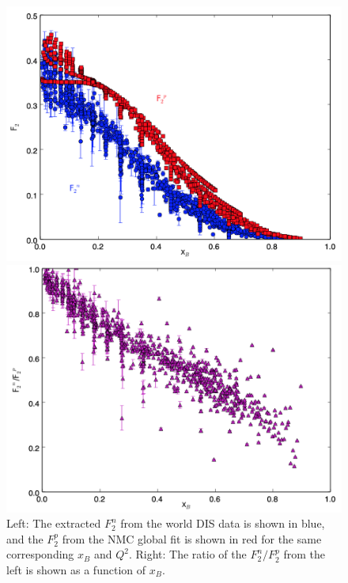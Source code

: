 \documentclass[oneside]{article}
\begin{document}
 \begin{figure}
\begin{minipage}{0.5\textwidth}
 \includegraphics[width=\textwidth]{plots/f2np_plot.png}
\end{minipage}\hfill\begin{minipage}{0.5\textwidth}
 \includegraphics[width=\textwidth]{plots/f2npratio_plot.png}
 \end{minipage}
  \caption[$F_2^{n,p}$ characteristics]{Left: The extracted $F_2^n$ from the world DIS data is shown in blue, and the $F_2^p$ from the NMC global fit is shown in red for the same corresponding $x_B$ and $Q^2$. Right: The ratio of the $F_2^n/F_2^p$ from the left is shown as a function of $x_B$.}
  \label{fig:F2np_general}
\end{figure} 
\end{document}

